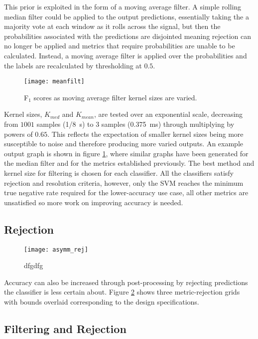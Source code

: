        This prior is exploited in the form of a moving average filter. A simple rolling median filter could be applied to the output predictions, essentially taking the a majority vote at each window as it rolls across the signal, but then the probabilities associated with the predictions are disjointed meaning rejection can no longer be applied and metrics that require probabilities are unable to be calculated. Instead, a moving average filter is applied over the probabilities and the labels are recalculated by thresholding at $0.5$.
        \begin{figure}[ht]
            \centering
            \texttt{[image: meanfilt]}
            \caption{F$_{1}$ scores as moving average filter kernel sizes are varied.}
            \label{fig:exp-postproc-filt}
        \end{figure}
        Kernel sizes, $K_{med}$ and $K_{mean}$, are tested over an exponential scale, decreasing from $1001$ samples (\SI{1/8}{\second}) to $3$ samples (\SI{0.375}{\milli\second}) through multiplying by powers of $0.65$. This reflects the expectation of smaller kernel sizes being more susceptible to noise and therefore producing more varied outputs. An example output graph is shown in figure \ref{fig:exp-postproc-filt}, where similar graphs have been generated for the median filter and for the metrics established previously. The best method and kernel size for filtering is chosen for each classifier. All the classifiers satisfy rejection and resolution criteria, however, only the SVM reaches the minimum true negative rate required for the lower-accuracy use case, all other metrics are unsatisfied so more work on improving accuracy is needed.

    \subsection{Rejection}
    \label{subsec:exp-postproc-rej}
        \begin{figure}[ht]
            \centering
            \texttt{[image: asymm\_rej]}
            \caption{dfgdfg}
            \label{fig:exp-postproc-asymrej}
        \end{figure}
        Accuracy can also be increased through post-processing by rejecting predictions the classifier is less certain about. Figure \ref{fig:exp-postproc-asymrej} shows three metric-rejection grids with bounds overlaid corresponding to the design specifications. 
    
    \subsection{Filtering and Rejection}
